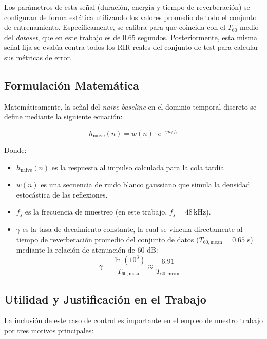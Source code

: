Los parámetros de esta señal (duración, energía y tiempo de reverberación) se configuran de forma estática utilizando los valores promedio de todo el conjunto de entrenamiento. Específicamente, se calibra para que coincida con el $T_{60}$ medio del \textit{dataset}, que en este trabajo es de 0.65 segundos. Posteriormente, esta misma señal fija se evalúa contra todos los RIR reales del conjunto de test para calcular sus métricas de error.

\subsection*{Formulación Matemática}
Matemáticamente, la señal del \textit{naive baseline} en el dominio temporal discreto se define mediante la siguiente ecuación:

\begin{equation}
    h_{\mathrm{naive}}(n) = w(n) \cdot e^{-\gamma n / f_s}
\end{equation}

Donde:
\begin{itemize}
    \item $h_{\mathrm{naive}}(n)$ es la respuesta al impulso calculada para la cola tardía.
    \item $w(n)$ es una secuencia de ruido blanco gaussiano que simula la densidad estocástica de las reflexiones.
    \item $f_s$ es la frecuencia de muestreo (en este trabajo, $f_s=48\,\mathrm{kHz}$).
    \item $\gamma$ es la tasa de decaimiento constante, la cual se vincula directamente al tiempo de reverberación promedio del conjunto de datos ($T_{60,\mathrm{mean}} = 0.65$ s) mediante la relación de atenuación de 60 dB:
    \begin{equation}
        \gamma = \frac{\ln(10^3)}{T_{60,\mathrm{mean}}} \approx \frac{6.91}{T_{60,\mathrm{mean}}}
    \end{equation}
\end{itemize}

\subsection*{Utilidad y Justificación en el Trabajo}
La inclusión de este caso de control es importante en el empleo de nuestro trabajo por tres motivos principales:

